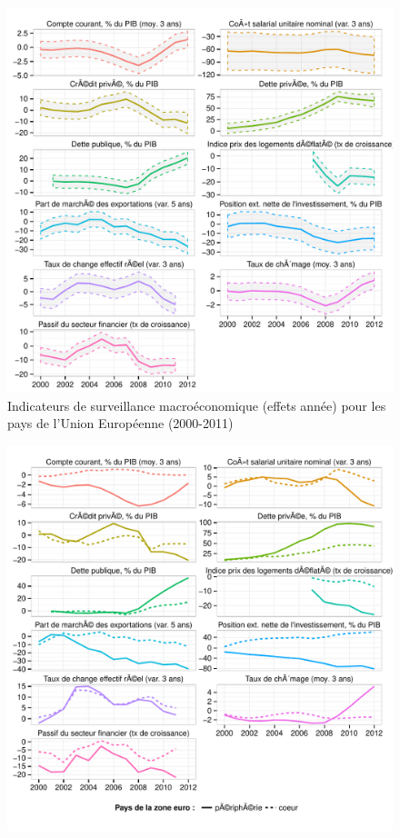 \documentclass{article}\usepackage[]{graphicx}\usepackage[]{color}
\makeatletter
\def\maxwidth{ %
  \ifdim\Gin@nat@width>\linewidth
    \linewidth
  \else
    \Gin@nat@width
  \fi
}
\newenvironment{knitrout}{}{} %
\makeatother
\begin{document}
\begin{knitrout}
\color{fgcolor}\begin{figure}[p]


{\centering \includegraphics[width=\maxwidth]{figure_graph/panel1} 

}

\caption[Indicateurs de surveillance macroéconomique (effets année) pour les pays de l'Union Européenne (2000-2011)]{Indicateurs de surveillance macroéconomique (effets année) pour les pays de l'Union Européenne (2000-2011)\label{fig:panel1}}
\end{figure}

\begin{figure}[p]


{\centering \includegraphics[width=\maxwidth]{figure_graph/panel2} 

}
\end{figure}
\end{knitrout}
\end{document}

